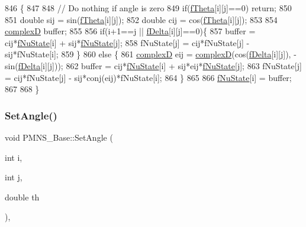 \begin{DoxyCode}
846                                        \{
847 
848   \textcolor{comment}{// Do nothing if angle is zero}
849   \textcolor{keywordflow}{if}(\hyperlink{classOscProb_1_1PMNS__Base_a1976887cd658dd86b2336c181f1470b4}{fTheta}[i][j]==0) \textcolor{keywordflow}{return};
850   
851   \textcolor{keywordtype}{double} sij = sin(\hyperlink{classOscProb_1_1PMNS__Base_a1976887cd658dd86b2336c181f1470b4}{fTheta}[i][j]);
852   \textcolor{keywordtype}{double} cij = cos(\hyperlink{classOscProb_1_1PMNS__Base_a1976887cd658dd86b2336c181f1470b4}{fTheta}[i][j]);
853   
854   \hyperlink{EigenPoint_8h_a67ca8e107e20610c3fff78d5e726ece0}{complexD} buffer;
855   
856   \textcolor{keywordflow}{if}(i+1==j || \hyperlink{classOscProb_1_1PMNS__Base_ab2a5fa40e689b221c8a7d2c17213810d}{fDelta}[i][j]==0)\{
857     buffer      = cij*\hyperlink{classOscProb_1_1PMNS__Base_abf99f2339e3ee989600740b5d88063e8}{fNuState}[i] + sij*\hyperlink{classOscProb_1_1PMNS__Base_abf99f2339e3ee989600740b5d88063e8}{fNuState}[j];
858     fNuState[j] = cij*fNuState[j] - sij*fNuState[i];
859   \}
860   \textcolor{keywordflow}{else} \{
861     \hyperlink{EigenPoint_8h_a67ca8e107e20610c3fff78d5e726ece0}{complexD} eij = \hyperlink{EigenPoint_8h_a67ca8e107e20610c3fff78d5e726ece0}{complexD}(cos(\hyperlink{classOscProb_1_1PMNS__Base_ab2a5fa40e689b221c8a7d2c17213810d}{fDelta}[i][j]), -sin(\hyperlink{classOscProb_1_1PMNS__Base_ab2a5fa40e689b221c8a7d2c17213810d}{fDelta}[i][j]));
862     buffer      = cij*\hyperlink{classOscProb_1_1PMNS__Base_abf99f2339e3ee989600740b5d88063e8}{fNuState}[i] + sij*eij*\hyperlink{classOscProb_1_1PMNS__Base_abf99f2339e3ee989600740b5d88063e8}{fNuState}[j];
863     fNuState[j] = cij*fNuState[j] - sij*conj(eij)*fNuState[i];
864   \}
865 
866   \hyperlink{classOscProb_1_1PMNS__Base_abf99f2339e3ee989600740b5d88063e8}{fNuState}[i] = buffer;
867   
868 \}
\end{DoxyCode}
\mbox{\label{classOscProb_1_1PMNS__Base_ace7875cf6d3bec161a2b7ed2690aec34}} 
\subsubsection{\texorpdfstring{Set\+Angle()}{SetAngle()}}
{\footnotesize\ttfamily void P\+M\+N\+S\+\_\+\+Base\+::\+Set\+Angle (\begin{DoxyParamCaption}\item[{int}]{i,  }\item[{int}]{j,  }\item[{double}]{th }\end{DoxyParamCaption})\hspace{0.3cm}{\ttfamily [virtual]}, {\ttfamily [inherited]}}


